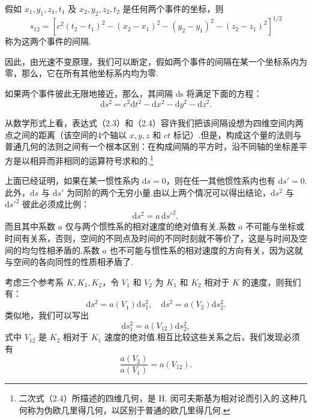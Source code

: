 假如 $x_1,y_1,z_1,t_1$ 及 $x_2,y_2,z_2,t_2$ 是任何两个事件的坐标，则
\begin{equation}
  s_{12}=[c^2(t_2-t_1)^2-(x_2-x_1)^2-(y_2-y_1)^2-(z_2-z_1)^2]^{1/2}
\end{equation}
称为这两个事件的间隔.

因此，由光速不变原理，我们可以断定，假如两个事件的间隔在某一个坐标系内为零，那么，它在所有其他坐标系内均为零.

如果两个事件彼此无限地接近，那么，其间隔 ds 将满足下面的方程：
\begin{equation}
  \mathrm{d}s^2=c^2\mathrm{d}t^2-\mathrm{d}x^2-\mathrm{d}y^2-\mathrm{d}z^2.
\end{equation}

从数学形式上看，表达式（2.3）和（2.4）容许我们把该间隔设想为四维空间内两点之间的距离（该空间的4个轴以 $x,y,z$ 和 $ct$ 标记）.但是，构成这个量的法则与普通几何的法则之间有一个根本区别：在构成间隔的平方时，沿不同轴的坐标差平方是以相异而非相同的运算符号求和的.\footnote{二次式（2.4）所描述的四维几何，是 H. 闵可夫斯基为相对论而引入的.这种几何称为伪欧几里得几何，以区别于普通的欧几里得几何.}

上面已经证明，如果在某一惯性系内 $\mathrm{d}s=0$，则在任一其他惯性系内也有 $\mathrm{d}s'=0$.此外，$\mathrm{d}s$ 与 $\mathrm{d}s'$ 为同阶的两个无穷小量.由以上两个情况可以得出结论，$\mathrm{d}s^2$ 与 $\mathrm{d}s'^2$ 彼此必须成比例：
\begin{equation*}
  \mathrm{d}s^2=a\,\mathrm{d}s'^2,
\end{equation*}
而且其中系数 $a$ 仅与两个惯性系的相对速度的绝对值有关.系数 $a$ 不可能与坐标或时间有关系，否则，空间的不同点及时间的不同时刻就不等价了，这是与时间及空间的均匀性相矛盾的.系数 $a$ 也不可能与惯性系的相对速度的方向有关，因为这就与空间的各向同性的性质相矛盾了.

考虑三个参考系 $K,K_1,K_2$，令 $V_1$ 和 $V_2$ 为 $K_1$ 和 $K_2$ 相对于 $K$ 的速度，则我们有：
\begin{equation*}
  \mathrm{d}s^2=a(V_1)\mathrm{d}s_1^2,\quad
  \mathrm{d}s^2=a(V_2)\mathrm{d}s_2^2.
\end{equation*}
类似地，我们可以写出
\begin{equation*}
  \mathrm{d}s_1^2=a(V_{12})\mathrm{d}s_2^2,
\end{equation*}
式中 $V_{12}$ 是 $K_2$ 相对于 $K_1$ 速度的绝对值.相互比较这些关系之后，我们发现必须有
\begin{equation}
  \frac{a(V_2)}{a(V_1)}=a(V_{12}).
\end{equation}

